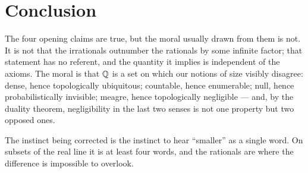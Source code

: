 \documentclass{essay}
\begin{document}
\section{Conclusion}

The four opening claims are true, but the moral usually drawn from them
is not. It is not that the irrationals outnumber the rationals by some
infinite factor; that statement has no referent, and the quantity it
implies is independent of the axioms. The moral is that $\mathbb{Q}$ is a set
on which our notions of size visibly disagree: dense, hence
topologically ubiquitous; countable, hence enumerable; null, hence
probabilistically invisible; meagre, hence topologically negligible ---
and, by the duality theorem, negligibility in the last two senses is
not one property but two opposed ones.

The instinct being corrected is the instinct to hear ``smaller'' as a
single word. On subsets of the real line it is at least four words, and
the rationals are where the difference is impossible to overlook.
\end{document}
